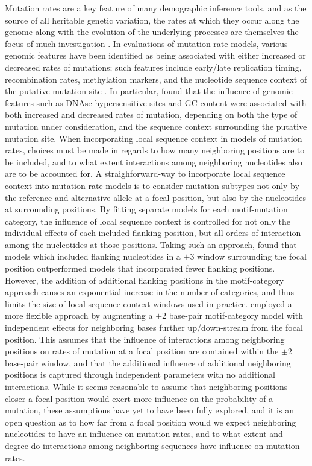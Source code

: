 Mutation rates are a key feature of many demographic inference tools, and as the source of all heritable genetic variation, the rates at which they occur along the genome along with the evolution of the underlying processes are themselves the focus of much investigation \citep{Carlson2018, Chintalapati2020, Gao2019, Harris2017, Moore2021, Narasimhan2017, Seplyarskiy2023, Seplyarskiy2021b, Seplyarskiy2021a, Sgurel2014}. In evaluations of mutation rate models, various genomic features have been identified as being associated with either increased or decreased rates of mutations; such features include early/late replication timing, recombination rates, methylation markers, and the nucleotide sequence context of the putative mutation site \citep{Carlson2018, Seplyarskiy2023}. In particular, \citep{Carlson2018} found that the influence of genomic features such as DNAse hypersensitive sites and GC content were associated with both increased and decreased rates of mutation, depending on both the type of mutation under consideration, and the sequence context surrounding the putative mutation site. When incorporating local sequence context in models of mutation rates, choices must be made in regards to how many neighboring positions are to be included, and to what extent interactions among neighboring nucleotides also are to be accounted for. A straighforward-way to incorporate local sequence context into mutation rate models is to consider mutation subtypes not only by the reference and alternative allele at a focal position, but also by the nucleotides at surrounding positions. By fitting separate models for each motif-mutation category, the influence of local sequence context is controlled for not only the individual effects of each included flanking position, but all orders of interaction among the nucleotides at those positions. Taking such an approach, \citep{Carlson2018} found that models which included flanking nucleotides in a $\pm 3$ window surrounding the focal position outperformed models that incorporated fewer flanking positions. However, the addition of additional flanking positions in the motif-category approach causes an exponential increase in the number of categories, and thus limits the size of local sequence context windows used in practice. \citep{Seplyarskiy2023} employed a more flexible approach by augmenting a $\pm 2$ base-pair motif-category model with independent effects for neighboring bases further up/down-stream from the focal position. This assumes that the influence of interactions among neighboring positions on rates of mutation at a focal position are contained within the $\pm 2$ base-pair window, and that the additional influence of additional neighboring positions is captured through independent parameters with no additional interactions. While it seems reasonable to assume that neighboring positions closer a focal position would exert more influence on the probability of a mutation, these assumptions have yet to have been fully explored, and it is an open question as to how far from a focal position would we expect neighboring nucleotides to have an influence on mutation rates, and to what extent and degree do interactions among neighboring sequences have influence on mutation rates.
 
